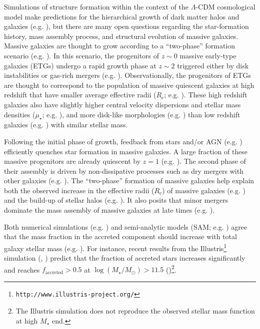 \documentclass[a4paper,fleqn,usenatbib]{mnras}
\def\mstar{{$M_{\star}$}}
\def\logms{{$\log (M_{\star}/M_{\odot})$}}
\def\mden{{$\mu_{\star}$}}
\begin{document}
    Simulations of structure formation within the context of the $\Lambda$-CDM 
    cosmological model make predictions for the hierarchical growth of dark matter 
    halos and galaxies (e.g. \citealt{Baugh1996, DeLucia2006}), but there are many 
    open questions regarding the star-formation history, mass assembly process, and 
    structural evolution of massive galaxies. 
    Massive galaxies are thought to grow according to a ``two-phase'' formation 
    scenario (e.g. \citealt{Oser2010, Oser2012}). 
    In this scenario, the progenitors of $z{\sim} 0$ massive early-type galaxies 
    (ETGs) undergo a rapid growth phase at $z{\sim} 2$ triggered either by disk 
    instabilities or gas-rich mergers (e.g. \citealt{Hopkins2008, Dekel2009}). 
    Observationally, the progenitors of ETGs are thought to correspond to the 
    population of massive quiescent galaxies at high redshift that have smaller 
    average effective radii ($R_{\mathrm{e}}$; e.g. \citealt{Trujillo2006, 
    vanDokkum2008, Cimatti2008}).  
    These high redshift galaxies also have slightly higher central velocity dispersions 
    and stellar mass densities (\mden{}; e.g. \citealt{vandeSande2011, Belli2014}), 
    and more disk-like morphologies (e.g. \citealt{vanderWel2011}) than low redshift 
    galaxies (e.g. \citealt{Bezanson2009, vanDokkum2010}) with similar stellar mass.
    
    Following the initial phase of growth, feedback from stars and/or AGN 
    (e.g. \citealt{Sijacki2007, Fabian2012}) efficiently quenches star formation in 
    massive galaxies. 
    A large fraction of these massive progenitors are already quiescent by $z=1$ 
    (e.g. \citealt{Bezanson2009, Kriek2016}). 
    The second phase of their assembly is driven by non-dissipative processes such 
    as dry mergers with other galaxies (e.g. \citealt{Naab2006, Khochfar2006}). 
    The ``two-phase'' formation of massive galaxies help explain both the 
    observed increase in the effective radii ($R_{\mathrm{e}}$) of massive galaxies 
    (e.g. \citealt{Newman2012, vdWel2014}) and the build-up of stellar 
    halos  (e.g. \citealt{Szomoru2012, Patel2013}). 
    It also posits that minor mergers dominate the mass assembly 
    of massive galaxies at late times 
    (e.g. \citealt{Hilz2012, Hilz2013, Oogi2013, Bedorf2013, Laporte2013}).
    
    Both numerical simulations (e.g. \citealt{Oser2010}) and 
    semi-analytic models (SAM; e.g. \citealt{LeeYi2013, LeeYi2017}) agree that the 
    mass fraction in the accreted component should increase with total galaxy stellar 
    mass (e.g. \citealt{Lackner2012, Cooper2013, Qu2017}).
    For instance, recent results from the 
    Illustris\footnote{\texttt{http://www.illustris-project.org/}} simulation 
    (\citealt{Vogelsberger2014}, \citealt{Genel2014}) predict that the fraction of  
    accreted stars increases significantly and reaches $f_{\mathrm{accreted}}>0.5$ at 
    \logms{}$>11.5$ (\citealt{RodriguezGomez2016})\footnote{The Illustris simulation
    does not reproduce the observed stellar mass function at high \mstar{} end.}. 
    
\end{document}
